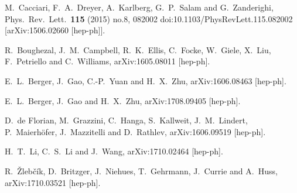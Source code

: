   M.~Cacciari, F.~A.~Dreyer, A.~Karlberg, G.~P.~Salam and G.~Zanderighi,
  Phys.\ Rev.\ Lett.\  {\bf 115} (2015) no.8,  082002
  doi:10.1103/PhysRevLett.115.082002
  [arXiv:1506.02660 [hep-ph]].



  R.~Boughezal, J.~M.~Campbell, R.~K.~Ellis, C.~Focke, W.~Giele, X.~Liu, F.~Petriello and C.~Williams,
  arXiv:1605.08011 [hep-ph].



  E.~L.~Berger, J.~Gao, C.-P.~Yuan and H.~X.~Zhu,
  arXiv:1606.08463 [hep-ph].

  E.~L.~Berger, J.~Gao and H.~X.~Zhu,
  arXiv:1708.09405 [hep-ph].


  D.~de Florian, M.~Grazzini, C.~Hanga, S.~Kallweit, J.~M.~Lindert, P.~Maierhöfer, J.~Mazzitelli and D.~Rathlev,
  arXiv:1606.09519 [hep-ph].



  H.~T.~Li, C.~S.~Li and J.~Wang,
  arXiv:1710.02464 [hep-ph].

  R.~Žlebčík, D.~Britzger, J.~Niehues, T.~Gehrmann, J.~Currie and A.~Huss,
  arXiv:1710.03521 [hep-ph].

